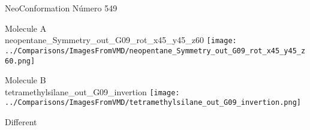 \vtab[-3cm]
\begin{center}
{\large NeoConformation \tab Número 549}
\end{center}
\begin{multicols}{2}
\begin{center}
Molecule A \\ 
neopentane\_Symmetry\_out\_G09\_rot\_x45\_y45\_z60
\texttt{[image: ../Comparisons/ImagesFromVMD/neopentane\_Symmetry\_out\_G09\_rot\_x45\_y45\_z60.png]}
\\
\vtab

\columnbreak
Molecule B \\ 
tetramethylsilane\_out\_G09\_invertion
\texttt{[image: ../Comparisons/ImagesFromVMD/tetramethylsilane\_out\_G09\_invertion.png]}
\\
\vtab


\end{center}
\end{multicols}
\begin{center}
\textcolor{NavyBlue}{\Large Different}
\end{center}

 \newpage

